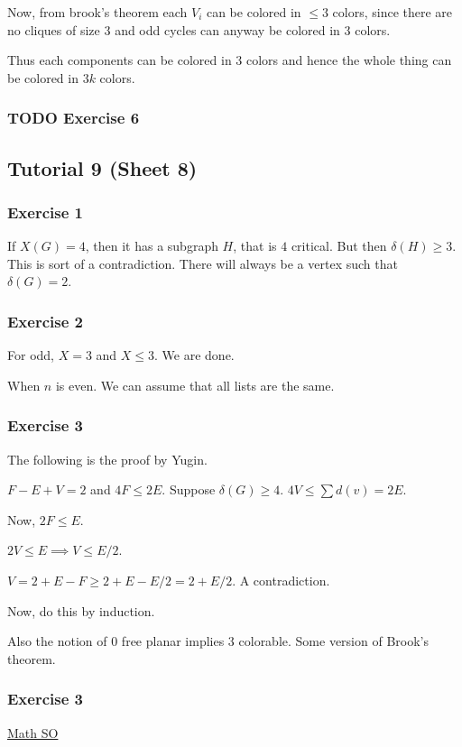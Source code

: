 \documentclass[11pt]{article}
\begin{document}
Now, from brook's theorem each \(V_i\) can be colored in \(\le 3\) colors,
since there are no cliques of size \(3\) and odd cycles can anyway be colored
in \(3\) colors.

Thus each components can be colored in \(3\) colors and hence the whole thing
can be colored in \(3k\) colors.
\subsubsection{{\bfseries\sffamily TODO} Exercise 6}
\label{sec:org425be87}
\subsection{Tutorial 9 (Sheet 8)}
\label{sec:org2f580a4}
\subsubsection{Exercise 1}
\label{sec:org1f1bde8}
If \(X(G) = 4\), then it has a subgraph \(H\), that is \(4\) critical. But then
\(\delta(H) \ge 3\). This is sort of a contradiction. There will always be a
vertex such that \(\delta(G) = 2\).
\subsubsection{Exercise 2}
\label{sec:orgbaddceb}
For odd, \(X = 3\) and \(X \le 3\). We are done.

When \(n\) is even. We can assume that all lists are the same.
\subsubsection{Exercise 3}
\label{sec:orgc1b175b}
The following is the proof by Yugin.

\(F - E + V = 2\) and \(4F \le 2E\). Suppose \(\delta(G) \ge 4\). \(4V \le \sum
    d(v) = 2E\).

Now, \(2F \le E\).

\(2V \le E \implies V \le E/2\).

\(V = 2 + E - F \ge 2 + E - E/2 = 2 + E/2\). A contradiction.

Now, do this by induction.

Also the notion of \(0\) free planar implies \(3\) colorable. Some version of
Brook's theorem.
\subsubsection{Exercise 3}
\label{sec:orge25d570}
\href{https://math.stackexchange.com/questions/454353/show-that-triangle-free-planar-graphs-are-four-colorable}{Math SO}
\end{document}
